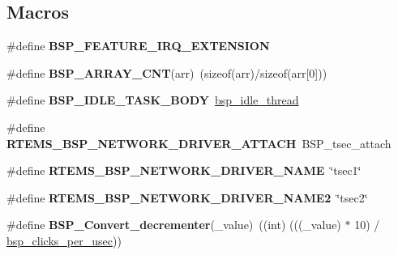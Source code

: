 \subsection*{Macros}
\begin{DoxyCompactItemize}
\item 
\mbox{\label{group__RTEMSBSPsPowerPCGen83XX_ga5d7d631d3a14b7554160f14eb42f351b}} 
\#define {\bfseries B\+S\+P\+\_\+\+F\+E\+A\+T\+U\+R\+E\+\_\+\+I\+R\+Q\+\_\+\+E\+X\+T\+E\+N\+S\+I\+ON}
\item 
\mbox{\label{group__RTEMSBSPsPowerPCGen83XX_ga2273b73c24176d4d83789adec96fb848}} 
\#define {\bfseries B\+S\+P\+\_\+\+A\+R\+R\+A\+Y\+\_\+\+C\+NT}(arr)~(sizeof(arr)/sizeof(arr\mbox{[}0\mbox{]}))
\item 
\mbox{\label{group__RTEMSBSPsPowerPCGen83XX_ga4aa606d0badadcc28e8054cb60f13b56}} 
\#define {\bfseries B\+S\+P\+\_\+\+I\+D\+L\+E\+\_\+\+T\+A\+S\+K\+\_\+\+B\+O\+DY}~\mbox{\hyperlink{group__RTEMSBSPsSPARCLEON3_ga301be7085b80c41a9c5887247003c662}{bsp\+\_\+idle\+\_\+thread}}
\item 
\mbox{\label{group__RTEMSBSPsPowerPCGen83XX_gadde0d66aef9442971dde465292ac14e6}} 
\#define {\bfseries R\+T\+E\+M\+S\+\_\+\+B\+S\+P\+\_\+\+N\+E\+T\+W\+O\+R\+K\+\_\+\+D\+R\+I\+V\+E\+R\+\_\+\+A\+T\+T\+A\+CH}~B\+S\+P\+\_\+tsec\+\_\+attach
\item 
\mbox{\label{group__RTEMSBSPsPowerPCGen83XX_ga86d4f9aa98431100692e31068070a8df}} 
\#define {\bfseries R\+T\+E\+M\+S\+\_\+\+B\+S\+P\+\_\+\+N\+E\+T\+W\+O\+R\+K\+\_\+\+D\+R\+I\+V\+E\+R\+\_\+\+N\+A\+ME}~\char`\"{}tsec1\char`\"{}
\item 
\mbox{\label{group__RTEMSBSPsPowerPCGen83XX_ga9c7a480d4bd0eabe6766c4c6e24a340b}} 
\#define {\bfseries R\+T\+E\+M\+S\+\_\+\+B\+S\+P\+\_\+\+N\+E\+T\+W\+O\+R\+K\+\_\+\+D\+R\+I\+V\+E\+R\+\_\+\+N\+A\+M\+E2}~\char`\"{}tsec2\char`\"{}
\item 
\mbox{\label{group__RTEMSBSPsPowerPCGen83XX_ga5b3b7a8f2f89a6110c93e0229f67c104}} 
\#define {\bfseries B\+S\+P\+\_\+\+Convert\+\_\+decrementer}(\+\_\+value)~((int) (((\+\_\+value) $\ast$ 10) / \mbox{\hyperlink{group__RTEMSBSPsPowerPCGen83XX_gabfae404b02d5b3193b9420930d97d84a}{bsp\+\_\+clicks\+\_\+per\+\_\+usec}}))
\end{DoxyCompactItemize}
